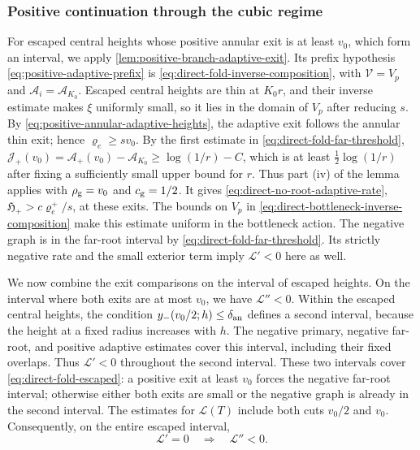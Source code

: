 \subsubsection{Positive continuation through the cubic regime}

For escaped central heights whose positive annular exit is at least
\(v_0\), which form an interval, we apply
\cref{lem:positive-branch-adaptive-exit}. Its prefix hypothesis
\eqref{eq:positive-adaptive-prefix} is
\eqref{eq:direct-fold-inverse-composition}, with \(\mathcal V=V_p\) and
\(\mathcal A_i=\mathcal A_{K_0}\). Escaped central heights are thin
at \(K_0r\), and their inverse estimate makes \(\xi\) uniformly small,
so it lies in the domain of \(V_p\) after reducing \(s\). By
\eqref{eq:positive-annular-adaptive-heights}, the adaptive exit follows
the annular thin exit; hence \(\varrho_e\ge sv_0\). By the first estimate in
\eqref{eq:direct-fold-far-threshold},
\(\mathcal J_+(v_0)=\mathcal A_+(v_0)-\mathcal A_{K_0}\ge\log(1/r)-C\), which is at
least \(\frac12\log(1/r)\) after fixing a sufficiently small upper bound
for \(r\). Thus part (iv) of the lemma applies with \(\rho_{\rm g}=v_0\)
and \(c_{\rm g}=1/2\). It gives \eqref{eq:direct-no-root-adaptive-rate},
\(\mathfrak H_+>c\varrho_e^+/s\), at these exits. The bounds on \(V_p\)
in \eqref{eq:direct-bottleneck-inverse-composition} make this estimate
uniform in the bottleneck action.
The negative graph is in the far-root interval by
\eqref{eq:direct-fold-far-threshold}. Its strictly
negative rate and the small exterior term imply
\(\mathcal L'<0\) here as well.

We now combine the exit comparisons on the interval of escaped heights.
On the interval where both exits are at most \(v_0\), we have
\(\mathcal L''<0\).
Within the escaped central heights, the condition
\(y_-(v_0/2;h)\le\delta_{\rm an}\) defines a second interval,
because the height at a fixed radius increases with \(h\).
The negative primary, negative far-root, and positive adaptive
estimates cover this interval, including their fixed overlaps.
Thus \(\mathcal L'<0\) throughout the second interval.
These two intervals cover
\eqref{eq:direct-fold-escaped}: a positive exit at least
\(v_0\) forces the negative far-root interval; otherwise
either both exits are small or the negative graph is
already in the second interval.
The estimates for \(\mathcal L(T)\) include both cuts
\(v_0/2\) and \(v_0\).
Consequently, on the entire escaped interval,
\begin{equation}
\label{eq:direct-escaped-critical-maximum}
 \mathcal L'=0\quad\Longrightarrow\quad\mathcal L''<0.
\end{equation}

